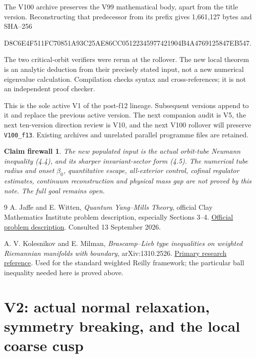 \documentclass[11pt,oneside]{article}
\newtheorem{firewall}[theorem]{Claim firewall}
\begin{document}
The V100 archive preserves the
V99 mathematical body, apart from
the title version. Reconstructing
that predecessor from its prefix
gives 1,661,127 bytes and SHA--256
\begin{center}\scriptsize\ttfamily
D8C6E4F511FC70851A93C25AE86CC05122345977421904B4A4769125847EB547.
\end{center}
The two critical-orbit verifiers
were rerun at the rollover. The
new local theorem is an analytic
deduction from their precisely
stated input, not a new numerical
eigenvalue calculation. Compilation
checks syntax and cross-references;
it is not an independent proof
checker.

This is the sole active V1 of
the post-f12 lineage. Subsequent
versions append to it and replace
the previous active version.
The next companion audit is V5,
the next ten-version direction
review is V10, and the next
V100 rollover will preserve
\texttt{V100\_f13}. Existing
archives and unrelated parallel
programme files are retained.

\begin{firewall}
The new populated input is the
actual orbit-tube Neumann
inequality (4.4), and its sharper
invariant-sector form (4.5).
The numerical tube radius and
onset \(\beta_0\), quantitative
escape, all-exterior control,
cofinal regulator estimates,
continuum reconstruction and
physical mass gap are not proved
by this note. The full goal
remains open.
\end{firewall}

\begin{thebibliography}{9}
A. Jaffe and E. Witten,
\emph{Quantum Yang--Mills Theory},
official Clay Mathematics Institute problem description,
especially Sections 3--4.
\href{https://www.claymath.org/wp-content/uploads/2022/06/yangmills.pdf}
{Official problem description}.
Consulted 13 September 2026.

A. V. Kolesnikov and E. Milman,
\emph{Brascamp--Lieb type inequalities on weighted
Riemannian manifolds with boundary},
arXiv:1310.2526.
\href{https://arxiv.org/abs/1310.2526}{Primary research reference}.
Used for the standard weighted Reilly framework;
the particular ball inequality needed here is
proved above.
\end{thebibliography}
\section{V2: actual normal relaxation, symmetry breaking, and the local coarse cusp}
\label{sec:f13v2}
\end{document}
